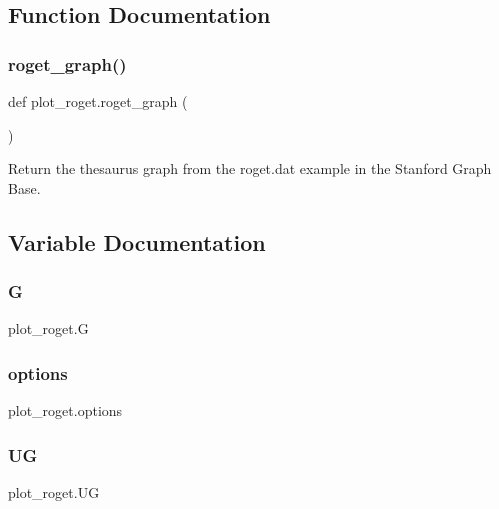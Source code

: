 \subsection{Function Documentation}
\mbox{\label{namespaceplot__roget_a68a3c4fa2f48d1c57eb4b9f17b31b4ff}} 
\subsubsection{\texorpdfstring{roget\+\_\+graph()}{roget\_graph()}}
{\footnotesize\ttfamily def plot\+\_\+roget.\+roget\+\_\+graph (\begin{DoxyParamCaption}{ }\end{DoxyParamCaption})}

\begin{DoxyVerb}Return the thesaurus graph from the roget.dat example in
the Stanford Graph Base.
\end{DoxyVerb}
 

\subsection{Variable Documentation}
\mbox{\label{namespaceplot__roget_a571531a7df84b3fc52a822fff9facd4b}} 
\subsubsection{\texorpdfstring{G}{G}}
{\footnotesize\ttfamily plot\+\_\+roget.\+G}

\mbox{\label{namespaceplot__roget_a889a371eb115bd18f040b255d2b958ba}} 
\subsubsection{\texorpdfstring{options}{options}}
{\footnotesize\ttfamily plot\+\_\+roget.\+options}

\mbox{\label{namespaceplot__roget_a68c0b463d5c13c9834d9841af94dc962}} 
\subsubsection{\texorpdfstring{UG}{UG}}
{\footnotesize\ttfamily plot\+\_\+roget.\+UG}

